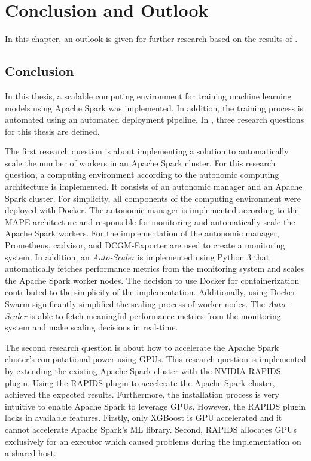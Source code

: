 \chapter{Conclusion and Outlook}
\label{chap:08_outlook}

In this chapter, an outlook is given for further research based on the results of .


\section{Conclusion}
\label{sec:08_conclusion}
In this thesis, a scalable computing environment for training machine learning models using Apache Spark was implemented. In addition, the training process is automated using an automated deployment pipeline.
In , three research questions for this thesis are defined.


The first research question is about implementing a solution to automatically scale the number of workers in an Apache Spark cluster.
For this research question, a computing environment according to the autonomic computing architecture is implemented.
It consists of an autonomic manager and an Apache Spark cluster.
For simplicity, all components of the computing environment were deployed with Docker.
The autonomic manager is implemented according to the MAPE architecture and responsible for monitoring and automatically scale the Apache Spark workers.
For the implementation of the autonomic manager, Prometheus, cadvisor, and DCGM-Exporter are used to create a monitoring system.
In addition, an \textit{Auto-Scaler} is implemented using Python 3 that automatically fetches performance metrics from the monitoring system and scales the Apache Spark worker nodes.
The decision to use Docker for containerization contributed to the simplicity of the implementation. Additionally, using Docker Swarm significantly simplified the scaling process of worker nodes. The \textit{Auto-Scaler} is able to fetch meaningful performance metrics from the monitoring system and make scaling decisions in real-time.


The second research question is about how to accelerate the Apache Spark cluster's computational power using GPUs.
This research question is implemented by extending the existing Apache Spark cluster with the NVIDIA RAPIDS plugin.
Using the RAPIDS plugin to accelerate the Apache Spark cluster, achieved the expected results. Furthermore, the installation process is very intuitive to enable Apache Spark to leverage GPUs. However, the RAPIDS plugin lacks in available features. Firstly, only XGBoost is GPU accelerated and it cannot accelerate Apache Spark's ML library. Second, RAPIDS allocates GPUs exclusively for an executor which caused problems during the implementation on a shared host.


